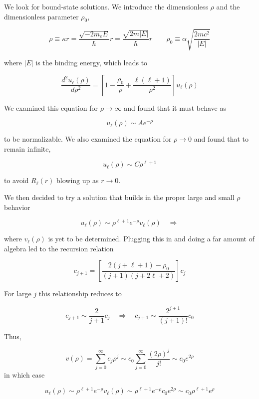 We look for bound-state solutions. We introduce the dimensionless $\rho$ and
the dimensionless parameter $\rho_0$, 

\[
\rho \equiv \kappa r = \frac{\sqrt{-2m_e E}}{\hbar}r
= \frac{\sqrt{2m|E|}}{\hbar}r \qquad \rho_0 \equiv \alpha
\sqrt{\frac{2mc^2}{|E|}}
\] \vspace{3px}

where $|E|$ is the binding energy, which leads to 

\[
\frac{d^2 u_\ell (\rho)}{d \rho^2} = \left[ 1 - \frac{\rho_0}{\rho}
+ \frac{\ell (\ell +1)}{\rho^2}\right] u_\ell (\rho)
\] \vspace{3px}

We examined this equation for $\rho \rightarrow \infty$ and found that it must
behave as 

\[
  u_\ell (\rho) \sim Ae^{-\rho}
\] \vspace{3px}

to be normalizable. We also examined the equation for $\rho \rightarrow 0$ and
found that to remain infinite, 

\[
  u_\ell (\rho) \sim C\rho^{\ell +1}
\] \vspace{3px}

to avoid $R_\ell (r)$ blowing up as $r\rightarrow 0$. 

We then decided to try a solution that builds in the proper large and small
$\rho$ behavior 

\[
  u_\ell (\rho) \sim \rho^{\ell +1} e^{-\rho} v_\ell (\rho) \quad \Rightarrow
\] \vspace{3px}

where $v_\ell (\rho)$ is yet to be determined. Plugging this in and doing
a far amount of algebra led to the recursion relation 

\[
  c_{j+1} = \left[ \frac{2(j+\ell +1) - \rho_0}{(j+1)(j+2\ell +2)} \right] c_j
\] \vspace{3px}

For large $j$ this relationship reduces to 

\[
  c_{j+1} \sim \frac{2}{j+1}c_j \quad \Rightarrow \quad c_{j+1} \sim
  \frac{2^{j+1}}{(j+1)!}c_0
\] \vspace{3px}

Thus, 

\[
v(\rho) = \sum_{j=0}^{\infty} c_j \rho^j \sim c_0 \sum_{j=0}^{\infty}
\frac{(2\rho)^j}{j!} \sim c_0 e^{2\rho}
\] \vspace{3px}
in which case 

\[
  u_\ell (\rho) \sim \rho^{\ell +1} e^{-\rho} v_\ell (\rho) \sim \rho^{\ell +1}
  e^{-\rho} c_0 e^{2\rho} \sim c_0 \rho^{\ell +1} e^\rho
\] \vspace{3px}

